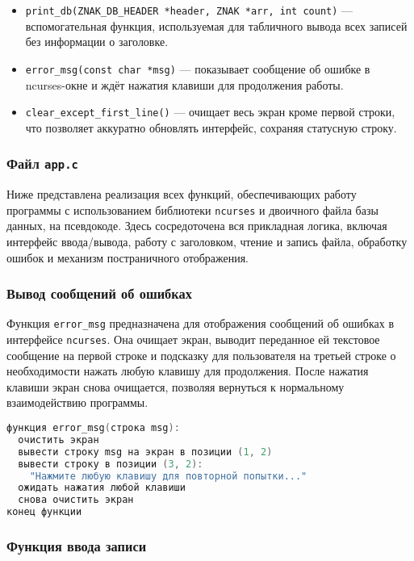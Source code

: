 \begin{itemize}
  \item \texttt{print\_db(ZNAK\_DB\_HEADER *header, ZNAK *arr, int count)} — вспомогательная функция, используемая для табличного вывода всех записей без информации о заголовке.
  
  \item \texttt{error\_msg(const char *msg)} — показывает сообщение об ошибке в ncurses-окне и ждёт нажатия клавиши для продолжения работы.
  
  \item \texttt{clear\_except\_first\_line()} — очищает весь экран кроме первой строки, что позволяет аккуратно обновлять интерфейс, сохраняя статусную строку.
\end{itemize}

\subsubsection*{Файл \texttt{app.c}}

Ниже представлена реализация всех функций, обеспечивающих работу программы с использованием библиотеки \texttt{ncurses} и двоичного файла базы данных, на псевдокоде. Здесь сосредоточена вся прикладная логика, включая интерфейс ввода/вывода, работу с заголовком, чтение и запись файла, обработку ошибок и механизм постраничного отображения.

\subsubsection*{Вывод сообщений об ошибках}

Функция \texttt{error\_msg} предназначена для отображения сообщений об ошибках в интерфейсе \texttt{ncurses}. Она очищает экран, выводит переданное ей текстовое сообщение на первой строке и подсказку для пользователя на третьей строке о необходимости нажать любую клавишу для продолжения. После нажатия клавиши экран снова очищается, позволяя вернуться к нормальному взаимодействию программы.

\begin{lstlisting}[language=C, caption=Функция error\_msg]
функция error_msg(строка msg):
  очистить экран
  вывести строку msg на экран в позиции (1, 2)
  вывести строку в позиции (3, 2):
    "Нажмите любую клавишу для повторной попытки..."
  ожидать нажатия любой клавиши
  снова очистить экран
конец функции
\end{lstlisting}

\subsubsection*{Функция ввода записи}

